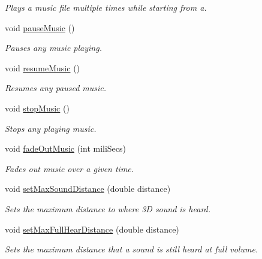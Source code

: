 \begin{CompactItemize}
\begin{CompactList}\small\item\em Plays a music file multiple times while starting from a. \item\end{CompactList}\item 
void \hyperlink{class_resource_mgr_f3b6d92284ff1e5e9238adbf810cbd48}{pauseMusic} ()
\begin{CompactList}\small\item\em Pauses any music playing. \item\end{CompactList}\item 
void \hyperlink{class_resource_mgr_f05542181d4d0464f549a1acac304151}{resumeMusic} ()
\begin{CompactList}\small\item\em Resumes any paused music. \item\end{CompactList}\item 
void \hyperlink{class_resource_mgr_c6c4165497719f7c5c523decb5dfe5fa}{stopMusic} ()
\begin{CompactList}\small\item\em Stops any playing music. \item\end{CompactList}\item 
void \hyperlink{class_resource_mgr_cdafe80888ac74a8eee3665b3cc31029}{fadeOutMusic} (int miliSecs)
\begin{CompactList}\small\item\em Fades out music over a given time. \item\end{CompactList}\item 
void \hyperlink{class_resource_mgr_79ba3b60c9aa385d450bb29e6404582f}{setMaxSoundDistance} (double distance)
\begin{CompactList}\small\item\em Sets the maximum distance to where 3D sound is heard. \item\end{CompactList}\item 
void \hyperlink{class_resource_mgr_d1461da9add565c7a7c363da051c8111}{setMaxFullHearDistance} (double distance)
\begin{CompactList}\small\item\em Sets the maximum distance that a sound is still heard at full volume. \item\end{CompactList}\item 

\end{CompactItemize}
